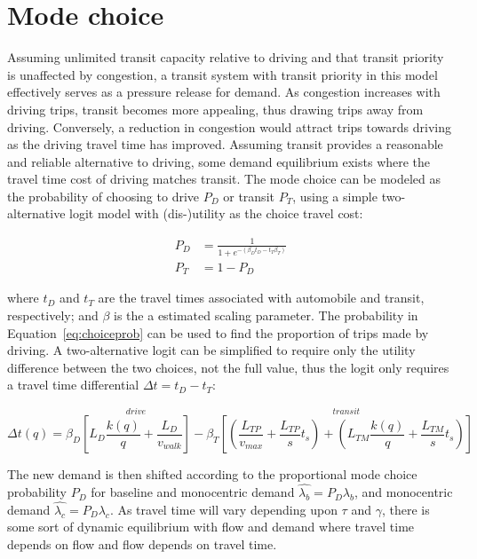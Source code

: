 \documentclass{article}
\begin{document}
\section{Mode choice}
Assuming unlimited transit capacity relative to driving and that transit priority is unaffected by congestion, a transit system with transit priority in this model effectively serves as a pressure release for demand. As congestion increases with driving trips, transit becomes more appealing, thus drawing trips away from driving. Conversely, a reduction in congestion would attract trips towards driving as the driving travel time has improved. Assuming transit provides a reasonable and reliable alternative to driving, some demand equilibrium exists where the travel time cost of driving matches transit. The mode choice can be modeled as the probability of choosing to drive $P_D$ or transit $P_T$, using a simple two-alternative logit model with (dis-)utility as the choice travel cost:

\begin{subequations}
    \label{eq:choiceprob}
    \begin{align}
        P_D & = \frac{1}{1+e^{- (\beta_D t_D-t_T \beta_T)}}\\
        P_T & = 1 - P_D
    \end{align}
\end{subequations}

\noindent where $t_D$ and $t_T$ are the travel times associated with automobile and transit, respectively; and $\beta$ is the a estimated scaling parameter. The probability in Equation~\eqref{eq:choiceprob} can be used to find the proportion of trips made by driving. A two-alternative logit can be simplified to require only the utility difference between the two choices, not the full value, thus the logit only requires a travel time differential $\Delta t = t_D - t_T$:

\begin{equation}
    \Delta t(q) = \beta_D\overset{drive}{\left[ L_D \frac{k(q)}{q} + \frac{L_D}{v_{walk}} \right]} - \beta_T \overset{transit}{\left[ \left( \frac{L_{TP}}{v_{max}} + \frac{L_{TP}}{s}t_s \right) + \left( L_{TM} \frac{k(q)}{q} + \frac{L_{TM}}{s}t_s \right) \right]}
\end{equation}

The new demand is then shifted according to the proportional mode choice probability $P_D$ for baseline and monocentric demand $\hat{\lambda_b} = P_D \lambda_b$, and monocentric demand $\hat{\lambda_c} = P_D \lambda_c$. As travel time will vary depending upon $\tau$ and $\gamma$, there is some sort of dynamic equilibrium with flow and demand where travel time depends on flow and flow depends on travel time. 
\end{document}
